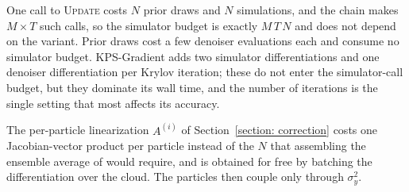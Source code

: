 One call to \textsc{Update} costs $N$ prior draws and $N$ simulations, and the chain makes
$M \times T$ such calls, so the simulator budget is exactly $M\,T\,N$ and does not depend on the
variant. Prior draws cost a few denoiser evaluations each and consume no simulator budget.
KPS-Gradient adds two simulator differentiations and one denoiser differentiation per Krylov
iteration; these do not enter the simulator-call budget, but they dominate its wall time, and the
number of iterations is the single setting that most affects its accuracy.

The per-particle linearization $A^{(i)}$ of Section~\ref{section: correction} costs one
Jacobian-vector product per particle instead of the $N$ that assembling the ensemble average of
 would require, and is obtained for free by batching the differentiation over the
cloud. The particles then couple only through $\sigma_y^{2}$.
